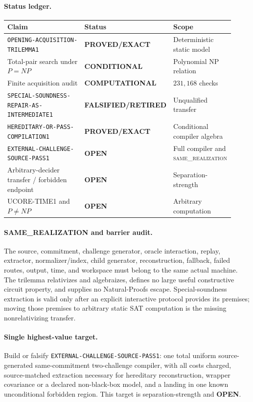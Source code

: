 \documentclass[11pt]{article}
\newcommand{\statusproved}{\textcolor{proved}{\textbf{PROVED/EXACT}}}
\newcommand{\statusopen}{\textcolor{openstatus}{\textbf{OPEN}}}
\newcommand{\statusretired}{\textcolor{retired}{\textbf{FALSIFIED/RETIRED}}}
\newcommand{\same}{\textnormal{\textsc{same\_realization}}}
\begin{document}
\paragraph{Status ledger.}
\begin{center}\scriptsize
\begin{tabular}{>{\raggedright\arraybackslash}p{0.43\linewidth}>{\raggedright\arraybackslash}p{0.22\linewidth}>{\raggedright\arraybackslash}p{0.27\linewidth}}
\toprule
Claim & Status & Scope\\ \midrule
\texttt{OPENING-ACQUISITION-TRILEMMA1} & \statusproved & Deterministic static model\\
Total-pair search under $P=NP$ & \textbf{CONDITIONAL} & Polynomial NP relation\\
Finite acquisition audit & \textbf{COMPUTATIONAL} & $231{,}168$ checks\\
\texttt{SPECIAL-SOUNDNESS-REPAIR-AS-INTERMEDIATE1} & \statusretired & Unqualified transfer\\
\texttt{HEREDITARY-OR-PASS-COMPILATION1} & \statusproved & Conditional compiler algebra\\
\texttt{EXTERNAL-CHALLENGE-SOURCE-PASS1} & \statusopen & Full compiler and \same\\
Arbitrary-decider transfer / forbidden endpoint & \statusopen & Separation-strength\\
UCORE-TIME1 and $P\ne NP$ & \statusopen & Arbitrary computation\\
\bottomrule
\end{tabular}
\end{center}

\paragraph{SAME\_REALIZATION and barrier audit.}
The source, commitment, challenge generator, oracle interaction, replay,
extractor, normalizer/index, child generator, reconstruction, fallback,
failed routes, output, time, and workspace must belong to the same actual
machine.  The trilemma relativizes and algebraizes, defines no large useful
constructive circuit property, and supplies no Natural-Proofs escape.
Special-soundness extraction is valid only after an explicit interactive
protocol provides its premises; moving those premises to arbitrary static SAT
computation is the missing nonrelativizing transfer.

\paragraph{Single highest-value target.}
Build or falsify \texttt{EXTERNAL-CHALLENGE-SOURCE-PASS1}: one total uniform
source-generated same-commitment two-challenge compiler, with all costs
charged, source-matched extraction necessary for hereditary reconstruction,
wrapper covariance or a declared non-black-box model, and a landing in one
known unconditional forbidden region.  This target is separation-strength
and \statusopen.
\end{document}
